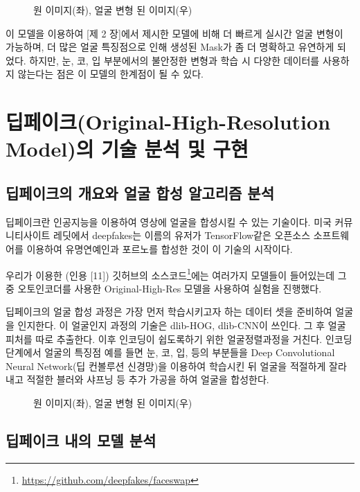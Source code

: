 \begin{figure}[h!]
\centering
\caption{원 이미지(좌), 얼굴 변형 된 이미지(우)}
\end{figure}



이 모델을 이용하여 [제 2 장]에서 제시한 모델에 비해 더 빠르게 실시간 얼굴 변형이 가능하며, 더 많은 얼굴 특징점으로 인해 생성된 Mask가 좀 더 명확하고 유연하게 되었다. 하지만, 눈, 코, 입 부분에서의 불안정한 변형과 학습 시 다양한 데이터를 사용하지 않는다는 점은 이 모델의 한계점이 될 수 있다.

\chapter{딥페이크(Original-High-Resolution Model)의 기술 분석 및 구현}

\section{ 딥페이크의 개요와 얼굴 합성 알고리즘 분석}

딥페이크란 인공지능을 이용하여 영상에 얼굴을 합성시킬 수 있는 기술이다. 미국 커뮤니티사이트 레딧에서 deepfakes는 이름의 유저가 TensorFlow같은 오픈소스 소프트웨어를 이용하여 유명연예인과 포르노를 합성한 것이 이 기술의 시작이다.

우리가 이용한 (인용 [11]) 깃허브의 소스코드\footnote{\protect\url{https://github.com/deepfakes/faceswap}}에는 여러가지 모델들이 들어있는데 그 중 오토인코더를 사용한 Original-High-Res 모델을 사용하여 실험을 진행했다.

딥페이크의 얼굴 합성 과정은 가장 먼저 학습시키고자 하는 데이터 셋을 준비하여 얼굴을 인지한다. 이 얼굴인지 과정의 기술은 dlib-HOG, dlib-CNN이 쓰인다. 그 후 얼굴 피처를 따로 추출한다. 이후 인코딩이 쉽도록하기 위한 얼굴정렬과정을 거친다. 인코딩 단계에서 얼굴의 특징점 예를 들면 눈, 코, 입, 등의 부분들을 Deep Convolutional Neural Network(딥 컨볼루션 신경망)을 이용하여 학습시킨 뒤 얼굴을 적절하게 잘라내고 적절한 블러와 샤프닝 등 추가 가공을 하여 얼굴을 합성한다.


\begin{figure}[h!]
\centering
\caption{원 이미지(좌), 얼굴 변형 된 이미지(우)}
\end{figure}


\section{ 딥페이크 내의 모델 분석}

